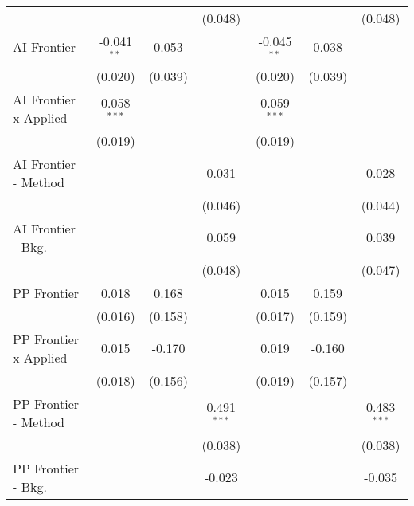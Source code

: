 \begin{tabular}{lcccccc}
                                  &                &              & (0.048)        &                &              & (0.048)\\   
   AI Frontier                    & -0.041$^{**}$  & 0.053        &                & -0.045$^{**}$  & 0.038        &   \\   
                                  & (0.020)        & (0.039)      &                & (0.020)        & (0.039)      &   \\   
   AI Frontier x Applied          & 0.058$^{***}$  &              &                & 0.059$^{***}$  &              &   \\   
                                  & (0.019)        &              &                & (0.019)        &              &   \\   
   AI Frontier - Method           &                &              & 0.031          &                &              & 0.028\\   
                                  &                &              & (0.046)        &                &              & (0.044)\\   
   AI Frontier - Bkg.             &                &              & 0.059          &                &              & 0.039\\   
                                  &                &              & (0.048)        &                &              & (0.047)\\   
   PP Frontier                    & 0.018          & 0.168        &                & 0.015          & 0.159        &   \\   
                                  & (0.016)        & (0.158)      &                & (0.017)        & (0.159)      &   \\   
   PP Frontier x Applied          & 0.015          & -0.170       &                & 0.019          & -0.160       &   \\   
                                  & (0.018)        & (0.156)      &                & (0.019)        & (0.157)      &   \\   
   PP Frontier - Method           &                &              & 0.491$^{***}$  &                &              & 0.483$^{***}$\\   
                                  &                &              & (0.038)        &                &              & (0.038)\\   
   PP Frontier - Bkg.             &                &              & -0.023         &                &              & -0.035\\   

\end{tabular}
